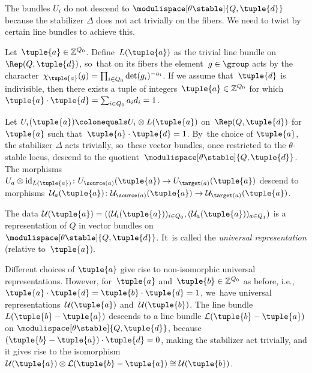 The bundles $U_i$ do not descend to $\modulispace[\theta\stable]{Q,\tuple{d}}$
because the stabilizer $\Delta$ does not act trivially on the fibers.
We need to twist by certain line bundles to achieve this.

Let~$\tuple{a} \in \mathbb{Z}^{Q_0}$.
Define~$L(\tuple{a})$ as the trivial line bundle on~$\Rep(Q,\tuple{d})$, so~that on its fibers the element~$g \in \group$ acts by
the character~$\chi_\tuple{a}(g) = \prod_{i \in Q_0} \det(g_i)^{-a_i}$.
If we assume that~$\tuple{d}$ is indivisible,
then there exists a tuple of integers~$\tuple{a} \in \mathbb{Z}^{Q_0}$
for which~$\tuple{a}\cdot\tuple{d}=\sum_{i \in Q_0}a_i d_i = 1$.

Let $U_i(\tuple{a}) \colonequals U_i \otimes L(\tuple{a})$ on~$\Rep(Q,\tuple{d})$
for~$\tuple{a}$ such that~$\tuple{a}\cdot\tuple{d}=1$. By~the choice of $\tuple{a}$, the stabilizer $\Delta$ acts trivially, so~these vector bundles, once restricted to the $\theta$-stable locus,
descend to the quotient~$\modulispace[\theta\stable]{Q,\tuple{d}}$.
The morphisms~$U_a \otimes \operatorname{id}_{L(\tuple{a})}\colon U_{\source(a)}(\tuple{a}) \to U_{\target(a)}(\tuple{a})$
descend to morphisms~$\mathcal{U}_a(\tuple{a})\colon \mathcal{U}_{\source(a)}(\tuple{a}) \to \mathcal{U}_{\target(a)}(\tuple{a})$.

\begin{definition}
The data $\mathcal{U}(\tuple{a}) = ((\mathcal{U}_i(\tuple{a}))_{i \in Q_0},(\mathcal{U}_a(\tuple{a}))_{a \in Q_1})$
is a representation of $Q$ in vector bundles on $\modulispace[\theta\stable]{Q,\tuple{d}}$. It~is called the \emph{universal representation} (relative to~$\tuple{a}$).
\end{definition}

\begin{remark}
\label{remark:uniqueness-up-to-twist-universal-bundle}
Different choices of $\tuple{a}$ give rise to non-isomorphic universal representations.
However, for~$\tuple{a}$ and~$\tuple{b} \in \mathbb{Z}^{Q_0}$ as before,
i.e., $\tuple{a}\cdot\tuple{d}=\tuple{b}\cdot\tuple{d}=1$, we~have universal representations~$\mathcal{U}(\tuple{a})$ and~$\mathcal{U}(\tuple{b})$.
The line bundle $L(\tuple{b} - \tuple{a})$
descends to a line bundle $\mathcal{L}(\tuple{b} - \tuple{a})$ on $\modulispace[\theta\stable]{Q,\tuple{d}}$,
because~$(\tuple{b}-\tuple{a})\cdot\tuple{d}=0$,
making the stabilizer act trivially,
and it gives rise to the isomorphism $\mathcal{U}(\tuple{a}) \otimes \mathcal{L}(\tuple{b} - \tuple{a}) \cong \mathcal{U}(\tuple{b})$.
\end{remark}

